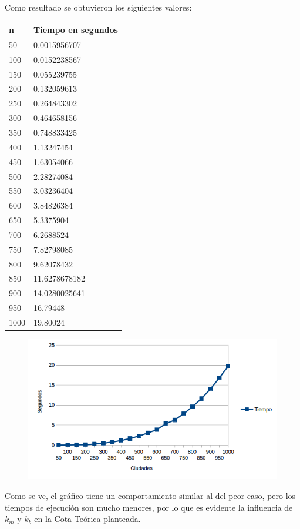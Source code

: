   
  Como resultado se obtuvieron los siguientes valores:
    \begin{table}[htb]
  \centering
  \begin{tabular}[c]{|l|l|}

		\hline
n & Tiempo en segundos\\
		\hline
50	&	0.0015956707\\
		\hline
100	&	0.0152238567\\
		\hline
150	&	0.055239755\\
		\hline
200	&	0.132059613\\
		\hline
250	&	0.264843302\\
		\hline
300	&	0.464658156\\
		\hline
350	&	0.748833425\\
		\hline
400	&	1.13247454\\
		\hline
450	&	1.63054066\\
		\hline
500	&	2.28274084\\
		\hline
550	&	3.03236404\\
		\hline
600	&	3.84826384\\
		\hline
650	&	5.3375904\\
		\hline
700	&	6.2688524\\
		\hline
750	&	7.82798085\\
		\hline
800	&	9.62078432\\
		\hline
850	&	11.6278678182\\
		\hline
900	&	14.0280025641\\
		\hline
950	&	16.79448\\
		\hline
1000	&	19.80024\\
		\hline

	\end{tabular}
	\end{table}
	
    \begin{figure}[h!]
   \begin{center}
	\includegraphics[scale=0.8]{imagenes/ej1/aleatorio1.png}
   \end{center}
  \end{figure}
  
  Como se ve, el gr\'afico tiene un comportamiento similar al del peor caso, pero los tiempos de ejecuci\'on son mucho menores, por lo que es evidente la influencia de $k_m$ y $k_b$ en la Cota Te\'orica planteada.
  
  
  
  
  
  
  
  
